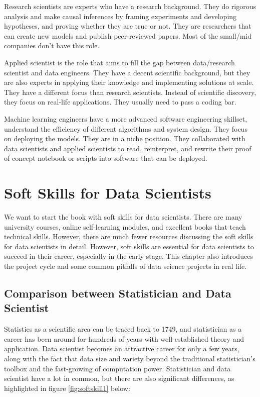 \documentclass[12pt,]{krantz}
\begin{document}
Research scientists are experts who have a research background. They do rigorous analysis and make causal inferences by framing experiments and developing hypotheses, and proving whether they are true or not. They are researchers that can create new models and publish peer-reviewed papers. Most of the small/mid companies don't have this role.

Applied scientist is the role that aims to fill the gap between data/research scientist and data engineers. They have a decent scientific background, but they are also experts in applying their knowledge and implementing solutions at scale. They have a different focus than research scientists. Instead of scientific discovery, they focus on real-life applications. They usually need to pass a coding bar.

Machine learning engineers have a more advanced software engineering skillset, understand the efficiency of different algorithms and system design. They focus on deploying the models. They are in a niche position. They collaborated with data scientists and applied scientists to read, reinterpret, and rewrite their proof of concept notebook or scripts into software that can be deployed.

\hypertarget{soft-skills-for-data-scientists}{%
\chapter{Soft Skills for Data Scientists}\label{soft-skills-for-data-scientists}}

We want to start the book with soft skills for data scientists. There are many university courses, online self-learning modules, and excellent books that teach technical skills. However, there are much fewer resources discussing the soft skills for data scientists in detail. However, soft skills are essential for data scientists to succeed in their career, especially in the early stage. This chapter also introduces the project cycle and some common pitfalls of data science projects in real life.

\hypertarget{comparison-between-statistician-and-data-scientist}{%
\section{Comparison between Statistician and Data Scientist}\label{comparison-between-statistician-and-data-scientist}}

Statistics as a scientific area can be traced back to 1749, and statistician as a career has been around for hundreds of years with well-established theory and application. Data scientist becomes an attractive career for only a few years, along with the fact that data size and variety beyond the traditional statistician's toolbox and the fast-growing of computation power. Statistician and data scientist have a lot in common, but there are also significant differences, as highlighted in figure \ref{fig:softskill1} below:
\end{document}
